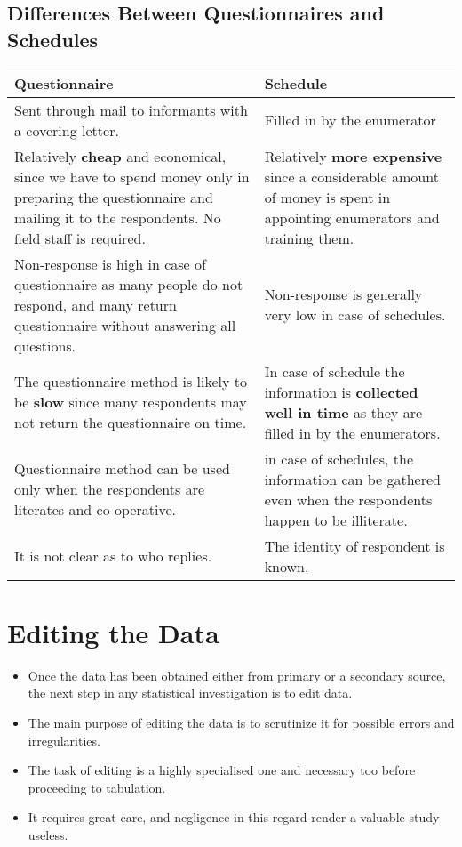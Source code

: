 \documentclass[
10pt, %
a4paper, %
]{report}
\begin{document}
\subsection{Differences Between Questionnaires and Schedules}
\begin{center}
\centering
\begin{tabular}{| p{} | p{} |}
\hline
Questionnaire & Schedule \\
\hline \hline 
Sent through mail to informants with a covering letter. & Filled in by the enumerator \\
\hline
Relatively \textbf{cheap} and economical, since we have to spend money only in preparing the questionnaire and mailing it to the respondents. No field staff is required. & Relatively \textbf{more expensive} since a considerable amount of money is spent in appointing enumerators and training them. \\
\hline
Non-response is high in case of questionnaire as many people do not respond, and many return questionnaire without answering all questions. & Non-response is generally very low in case of schedules. \\
\hline
The questionnaire method is likely to be \textbf{slow} since many respondents may not return the questionnaire on time. &
In case of schedule the information is \textbf{collected well in time} as they are filled in by the enumerators. \\
\hline
Questionnaire method can be used only when the respondents are literates and co-operative. & in case of schedules, the information can be gathered even when the respondents happen to be illiterate. \\
\hline
It is not clear as to who replies. & The identity of respondent is known. \\
\hline
\end{tabular}
\end{center}

\section{Editing the Data}
\begin{itemize}
\item Once the data has been obtained either from primary or a
secondary source, the next step in any statistical investigation
is to edit data.
\item The main purpose of editing the data is to scrutinize it for
possible errors and irregularities.
\item The task of editing is a highly specialised one and necessary
too before proceeding to tabulation.
\item It requires great care, and negligence in this regard render a valuable study useless.
\end{itemize}
\end{document}
